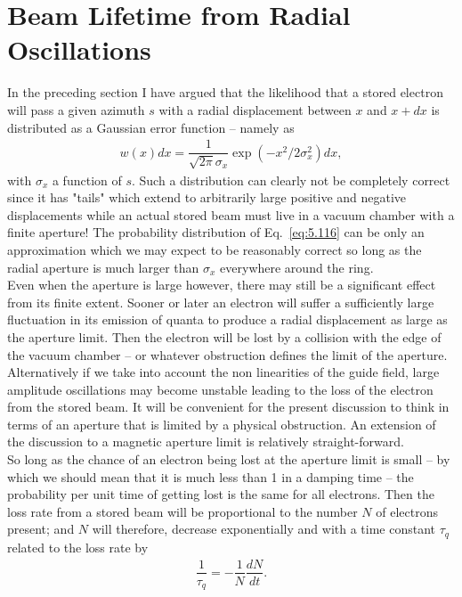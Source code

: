 \section{Beam Lifetime from Radial Oscillations} \label{eq:5.7}

In the preceding section I have argued that the likelihood that a stored electron will pass a given
 azimuth $s$ with a radial displacement between $x$ and $x + dx$ is distributed as a Gaussian error
 function -- namely as
\begin{align}\label{eq:5.116}
	w(x)dx = \dfrac{1}{\sqrt{2\pi}\sigma_x} \exp\left( -x^2/2\sigma_x^2 \right)dx,
\end{align}
with $\sigma_x$ a function of $s$. Such a distribution can clearly not be completely correct
since it has "tails" which extend to arbitrarily large positive and negative displacements while an actual stored beam must live in a vacuum chamber with a finite aperture! The probability
 distribution of Eq.~\eqref{eq:5.116} can be only an approximation which we may expect to be reasonably correct so long as the radial aperture is much larger than $\sigma_x$ everywhere around the ring.\\
Even when the aperture is large however, there may still be a significant effect from its finite extent. Sooner or later an electron will suffer a sufficiently large fluctuation in its emission of quanta to produce a radial displacement as large as the aperture limit. Then the electron will be lost by a collision with the edge of the vacuum chamber -- or whatever obstruction defines the limit of the aperture. Alternatively if we take into account the non linearities of the guide field, large amplitude oscillations may become unstable leading to the loss of the electron from the stored beam. It will be convenient for the present discussion to think in terms of an aperture
 that is limited by a physical obstruction. An extension of the discussion to a magnetic aperture
 limit is relatively straight-forward.\\
 So long as the chance of an electron being lost at the aperture limit is small -- by which we should mean that it is much less than 1 in a damping time -- the probability per unit time of getting lost is the same for all electrons. Then the loss rate from a stored beam will be proportional to the number $N$ of electrons present; and $N$ will therefore, decrease exponentially
 and with a time constant $\tau_q$ related to the loss rate by
\begin{align}
	\dfrac{1}{\tau_q} = - \dfrac{1}{N} \dfrac{dN}{dt}.
\end{align}
